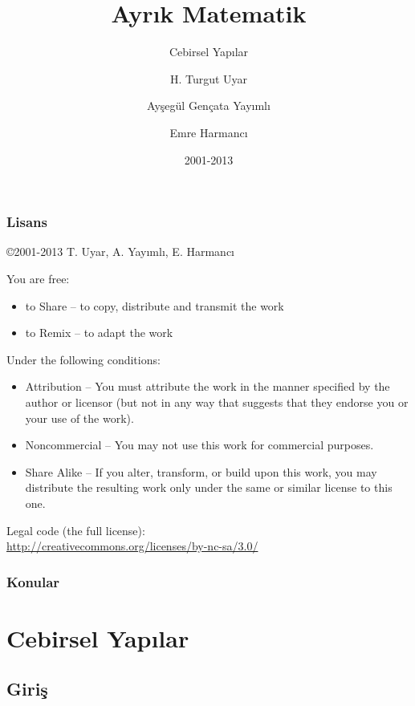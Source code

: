 \documentclass[dvipsnames]{beamer}
\title{Ayrık Matematik}
\subtitle{Cebirsel Yapılar}
\author{H. Turgut Uyar \and Ayşegül Gençata Yayımlı \and Emre Harmancı}
\date{2001-2013}
\theoremstyle{definition}
\theoremstyle{example}
\theoremstyle{plain}
\begin{document}
\begin{frame}
  \titlepage
\end{frame}

\begin{frame}
  \frametitle{Lisans}

  \hfill
  \copyright 2001-2013 T. Uyar, A. Yayımlı, E. Harmancı

  \vfill
  \begin{tiny}
    You are free:
    \begin{itemize}
      \item to Share -- to copy, distribute and transmit the work
      \item to Remix -- to adapt the work
    \end{itemize}

    Under the following conditions:
    \begin{itemize}
      \item Attribution -- You must attribute the work in the manner specified by
        the author or licensor (but not in any way that suggests that they
        endorse you or your use of the work).

      \item Noncommercial -- You may not use this work for commercial purposes.

      \item Share Alike -- If you alter, transform, or build upon this work, you
        may distribute the resulting work only under the same or similar license
        to this one.
    \end{itemize}
  \end{tiny}

  \vfill
  Legal code (the full license):\\
  \url{http://creativecommons.org/licenses/by-nc-sa/3.0/}
\end{frame}

\begin{frame}
  \frametitle{Konular}
  \tableofcontents
\end{frame}

\section{Cebirsel Yapılar}

\subsection{Giriş}
\end{document}
